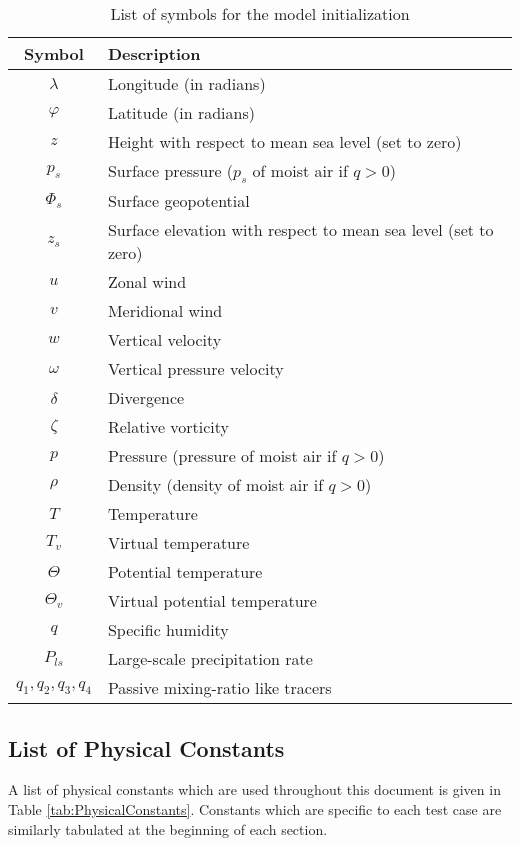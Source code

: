 \documentclass{article}
\begin{document}
\begin{table}[h]
\caption{List of symbols for the model initialization} \label{tab:symbols}
\begin{center}
\begin{tabular}{cl}
\hline Symbol & Description \\ \hline 
$\lambda$ & Longitude (in radians) \\
$\varphi$ & Latitude (in radians) \\
$z$ & Height with respect to mean sea level (set to zero) \\
$p_s$ & Surface pressure ($p_s$ of moist air if $q>0$) \\
$\Phi_s$ & Surface geopotential \\
$z_s$ & Surface elevation with respect to mean sea level (set to zero) \\
$u$ & Zonal wind \\
$v$ & Meridional wind \\
$w$ & Vertical velocity \\
$\omega$ & Vertical pressure velocity  \\
$\delta$ & Divergence\\
$\zeta$ & Relative vorticity\\
$p$ & Pressure (pressure of moist air if $q>0$) \\
$\rho$ & Density (density of moist air if $q>0$)\\
$T$ &Temperature \\
$T_v$ & Virtual temperature \\
$\Theta$ & Potential temperature \\
$\Theta_v$ & Virtual potential temperature \\
$q$ & Specific humidity \\
$P_{ls}$ & Large-scale precipitation rate \\
$q_1, q_2, q_3, q_4$ & Passive mixing-ratio like tracers \\
\hline 
\end{tabular}
\end{center}
\end{table}

\subsection{List of Physical Constants}
A list of physical constants which are used throughout this document is given in Table \ref{tab:PhysicalConstants}.  Constants which are specific to each test case are similarly tabulated at the beginning of each section.
\end{document}
